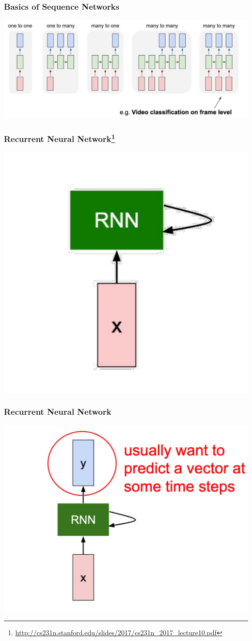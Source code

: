\documentclass[aspectratio=1610]{beamer} %
\begin{document}
\begin{frame}

\frametitle{Basics of Sequence Networks}

\begin{center}
\includegraphics[width=\textwidth]{pics/rnn5}
\end{center}

\end{frame}


\begin{frame}

\frametitle{Recurrent Neural Network\footnote{\url{http://cs231n.stanford.edu/slides/2017/cs231n_2017_lecture10.pdf}}}

\begin{center}
\includegraphics[width=.5\textwidth]{pics/rnnhow1}
\end{center}

\end{frame}


\begin{frame}

\frametitle{Recurrent Neural Network}

\begin{center}
\includegraphics[width=.5\textwidth]{pics/rnnhow2}
\end{center}

\end{frame}
\end{document}
